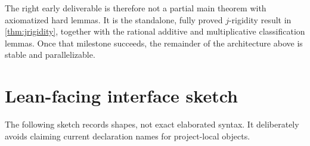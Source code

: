 \documentclass[11pt,oneside]{article}
\theoremstyle{definition}
\theoremstyle{remark}
\begin{document}
The right early deliverable is therefore not a partial main theorem with axiomatized hard
lemmas.  It is the standalone, fully proved $j$-rigidity result in
\cref{thm:jrigidity}, together with the rational additive and multiplicative
classification lemmas.  Once that milestone succeeds, the remainder of the architecture
above is stable and parallelizable.

\appendix

\section{Lean-facing interface sketch}

The following sketch records shapes, not exact elaborated syntax.  It deliberately avoids
claiming current declaration names for project-local objects.
\end{document}
